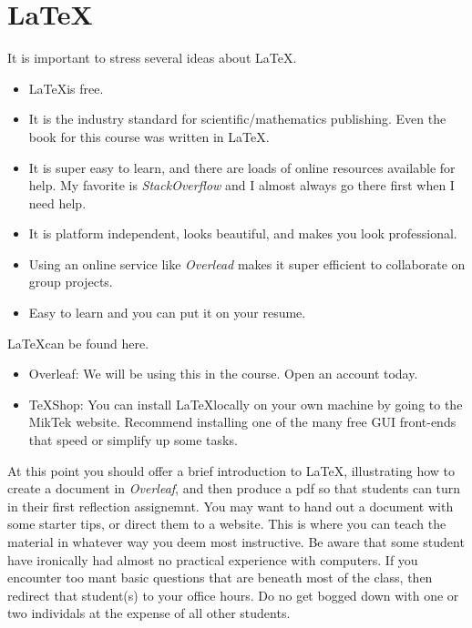 \section{\LaTeX}
\begin{remark}
It is important to stress several ideas about \LaTeX.
\ifKey
\color{red}

\begin{itemize}
\item \LaTeX is free.
\item It is the industry standard for scientific/mathematics publishing.  Even the book for this course was written in \LaTeX.
\item It is super easy to learn, and there are loads of online resources available for help.  My favorite is \emph{StackOverflow} and I almost always go there first when I need help.
\item It is platform independent, looks beautiful, and makes you look professional. 

\item Using an online service like \emph{Overlead} makes it super efficient to collaborate on group projects.
\item Easy to learn and you can put it on your resume.
\end{itemize}
\color{black}
\else
{}
\fi

\end{remark}

\ifKey
\color{red}
\LaTeX can be found here.
\begin{itemize}
	\item Overleaf:   We will be using this in the course.  Open an account today.
	\item TeXShop: You can install \LaTeX locally on your own machine by going to the MikTek website.  Recommend installing one of the many free GUI front-ends that speed or simplify up some tasks.
\end{itemize}
\color{black}
\else
{}
\fi

At this point you should offer a brief introduction to \LaTeX, illustrating how to create a document in \emph{Overleaf}, and then produce a pdf so that students can turn in their first reflection assignemnt.  You may want to hand out a document with some starter tips, or direct them to a website.  This is where you can teach the material in whatever way you deem most instructive.  Be aware that some student have ironically had almost no practical experience with computers.  If you encounter too mant basic questions that are beneath most of the class, then redirect that student(s) to your office hours.  Do no get bogged down with one or two individals at the expense of all other students.

